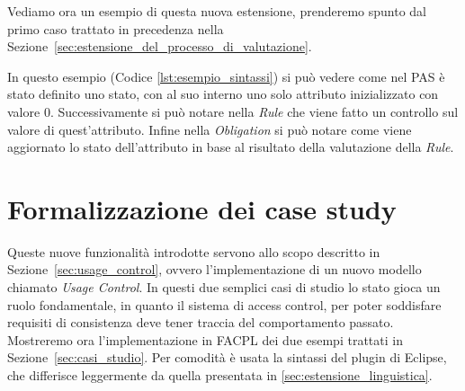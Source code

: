 Vediamo ora un esempio di questa nuova estensione, prenderemo spunto dal primo caso trattato in precedenza nella Sezione~\ref{sec:estensione_del_processo_di_valutazione}.

In questo esempio (Codice \ref{lst:esempio_sintassi}) si può vedere come nel PAS è stato definito uno stato, con al suo interno uno solo attributo inizializzato con valore $0$.
Successivamente si può notare nella \textit{Rule} che viene fatto un controllo sul valore di quest'attributo.
Infine nella \textit{Obligation} si può notare come viene aggiornato lo stato dell'attributo in base al risultato della valutazione della \textit{Rule}.

\section{Formalizzazione dei case study} %
\label{sec:esempi}

Queste nuove funzionalità introdotte servono allo scopo descritto in Sezione~\ref{sec:usage_control}, ovvero l'implementazione di un nuovo modello chiamato \textit{Usage Control}.
In questi due semplici casi di studio lo stato gioca un ruolo fondamentale, in quanto il sistema di access control, per poter soddisfare requisiti di consistenza deve tener traccia del comportamento passato.
Mostreremo ora l'implementazione in \ac{FACPL} dei due esempi trattati in Sezione~\ref{sec:casi_studio}. Per comodità è usata la sintassi del plugin di Eclipse, che differisce leggermente da quella presentata in \ref{sec:estensione_linguistica}. 

